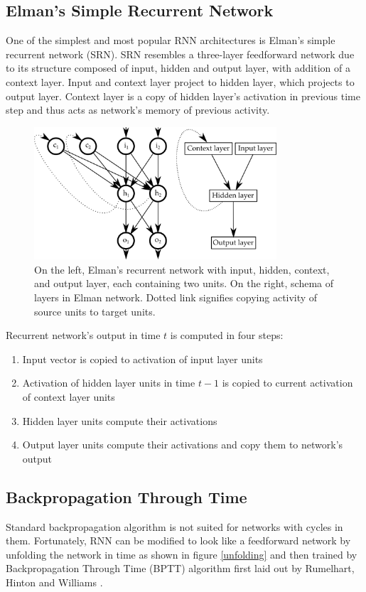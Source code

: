 \documentclass[12pt,oneside]{fithesis2}
\begin{document}
\subsection{Elman's Simple Recurrent Network}
One of the simplest and most popular RNN architectures is Elman's  simple recurrent network (SRN). SRN resembles a three-layer feedforward network due to its structure composed of input, hidden and output layer, with addition of a context layer. Input and context layer project to hidden layer, which projects to output layer. Context layer is a copy of hidden layer's activation in previous time step and thus acts as network's memory of previous activity.

	\begin{figure}[ht]
		\centering
		\includegraphics[width=341px]{elman-rnn.png}
		\caption{On the left, Elman's recurrent network with input, hidden, context, and output layer, each containing two units. On the right, schema of layers in Elman network. Dotted link signifies copying activity of source units to target units.}
	\end{figure}

Recurrent network's output in time $t$ is computed in four steps:
\begin{enumerate}
	\item Input vector is copied to activation of input layer units
	\item Activation of hidden layer units in time $t-1$ is copied to current activation of context layer units
	\item Hidden layer units compute their activations
	\item Output layer units compute their activations and copy them to network's output
\end{enumerate}
	
\subsection{Backpropagation Through Time}
Standard backpropagation algorithm is not suited for networks with cycles in them. Fortunately, RNN can be modified to look like a feedforward network by unfolding the network in time as shown in figure \ref{unfolding} and then trained by Backpropagation Through Time (BPTT) algorithm first laid out by Rumelhart, Hinton and Williams \cite{rumelhart-hinton-williams}.\par
\end{document}
